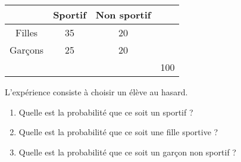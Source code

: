 
\begin{tabular}{|c|c|c|c|}
\hline 
 & Sportif & Non sportif &  \\ 
\hline 
Filles & 35 & 20 & \\ 
\hline 
Garçons & 25 & 20 &  \\ 
\hline 
 &  &  &100 \\ 
\hline 
\end{tabular} 


L'expérience consiste à choisir un élève au hasard. 

\begin{enumerate}
\item Quelle est la probabilité que ce soit un sportif ? 
\item Quelle est la probabilité que ce soit une fille sportive ?
\item Quelle est la probabilité que ce soit un garçon non sportif ?

\end{enumerate}

